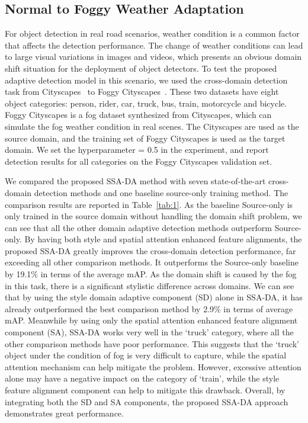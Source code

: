 \documentclass[runningheads]{llncs}
\begin{document}
\subsection{Normal to Foggy Weather Adaptation}\label{section:4.2}

For object detection in real road scenarios, weather condition is a common factor that affects the detection performance. 
The change of weather conditions can lead to large visual variations in images and videos, 
which presents an obvious domain shift situation for the deployment of object detectors. 
To test the proposed adaptive detection model in this scenario, 
we used the cross-domain detection task from
Cityscapes~\cite{cordts2016cityscapes} 
to Foggy Cityscapes~\cite{sakaridis2018semantic}. 
These two datasets have eight object categories:
person, rider, car, truck, bus, train, motorcycle and bicycle. 
Foggy Cityscapes is a fog dataset synthesized from Cityscapes,
which can simulate the fog weather condition in real scenes. 
The Cityscapes are used as the source domain, and the training set of Foggy Cityscapes is used as the target domain. 
We set the hyperparameter   = 0.5 in the experiment, and report detection results for all categories on the Foggy Cityscapes validation set.

We compared the proposed SSA-DA method with seven state-of-the-art cross-domain detection methods and one baseline source-only training method.
The comparison results are reported in Table~\ref{tab:1}. 
As the baseline Source-only is only trained in the source domain without handling the domain shift problem,
we can see that all the other domain adaptive detection methods outperform Source-only. 
By having both style and spatial attention enhanced feature alignments,
the proposed SSA-DA greatly improves the cross-domain detection performance, 
far exceeding all other comparison methods. 
It outperforms the Source-only baseline by 19.1\% in terms of the average mAP. 
As the domain shift is caused by the fog  in this task,
there is a significant stylistic difference across domains. 
We can see that by using the style domain adaptive component (SD) alone in SSA-DA, 
it has already outperformed the best comparison method by 2.9\% in terms of average mAP. 
Meanwhile 
by using only the spatial attention enhanced feature alignment component (SA),
SSA-DA works very well in the `truck' category, where all the other comparison methods have poor performance. 
This suggests that the `truck' object under the condition of fog is very difficult to capture, 
while the spatial attention mechanism can help mitigate the problem.
However, excessive attention alone may have a negative impact on the category of `train', 
while the style feature alignment component can help to mitigate this drawback. 
Overall, by integrating both the SD and SA components, the proposed SSA-DA approach demonstrates great performance.  
\end{document}
